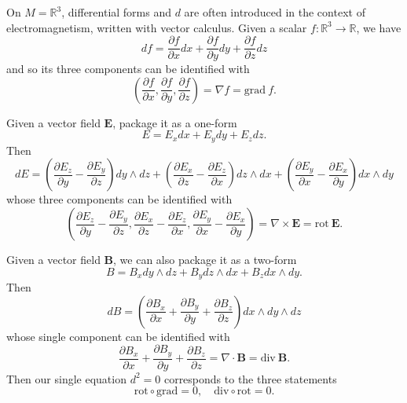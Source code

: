 \documentclass[12pt]{article}
\numberwithin{equation}{section}
\numberwithin{figure}{section}
\theoremstyle{remark}
\def\bR{\mathbb{R}}
\begin{document}
On $M=\bR^3$, differential forms and $d$ are often introduced in the context of electromagnetism, written with vector calculus.
Given a scalar $f:\bR^3\to \bR$, we have \begin{equation}
df = \frac{\partial f}{\partial x}dx + \frac{\partial f}{\partial y}dy + \frac{\partial f}{\partial z}dz
\end{equation}
and so its three components can be identified with \begin{equation}
(\frac{\partial f}{\partial x},\frac{\partial f}{\partial y},\frac{\partial f}{\partial z}) = \nabla f = \mathrm{grad}\ f.
\end{equation}

Given a vector field $\mathbf{E}$, package it as a one-form \begin{equation}
E= E_x dx + E_y dy + E_z dz.
\end{equation}
Then \begin{equation}
dE = \left(\frac{\partial E_z}{\partial y} - \frac{\partial E_y}{\partial z}\right) dy\wedge dz
+ \left(\frac{\partial E_x}{\partial z} - \frac{\partial E_z}{\partial x}\right) dz\wedge dx
+ \left(\frac{\partial E_y}{\partial x} - \frac{\partial E_x}{\partial y}\right) dx\wedge dy
\end{equation}
whose three components can be identified with \begin{equation}
\left(\frac{\partial E_z}{\partial y} - \frac{\partial E_y}{\partial z},\frac{\partial E_x}{\partial z} - \frac{\partial E_z}{\partial x},\frac{\partial E_y}{\partial x} - \frac{\partial E_x}{\partial y}\right) = \nabla\times \mathbf{E} = \mathrm{rot}\ \mathbf{E}.
\end{equation}

Given a vector field $\mathbf{B}$, we can also package it as a two-form \begin{equation}
B = B_x dy\wedge dz + B_y dz\wedge dx + B_z dx\wedge dy.
\end{equation}
Then \begin{equation}
  dB=(\frac{\partial B_x}{\partial x} + \frac{\partial B_y}{\partial y} + \frac{\partial B_z}{\partial z}) dx\wedge dy\wedge dz
\end{equation}
whose single component can be identified with \begin{equation}
\frac{\partial B_x}{\partial x} + \frac{\partial B_y}{\partial y} + \frac{\partial B_z}{\partial z} = \nabla\cdot \mathbf{B} = \mathrm{div}\ \mathbf{B}.
\end{equation}
Then our single equation $d^2=0$ corresponds to the three statements \begin{equation}
  \mathrm{rot} \circ \mathrm{grad} = 0,\quad
  \mathrm{div} \circ \mathrm{rot} = 0.
\end{equation}
\end{document}
